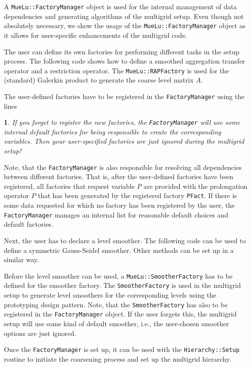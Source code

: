 \documentclass[10pt,fleqn]{book}
\newtheorem*{mycomment}{\ding{42}}
\providecommand\printCppListing[1]{

}
\begin{document}
A \texttt{MueLu::FactoryManager} object is used for the internal management of data dependencies and generating algorithms of the multigrid setup. Even though not absolutely necessary, we show the usage of the \texttt{MueLu::FactoryManager} object as it allows for  user-specific enhancements of the multigrid code.
\printCppListing{ScalingTest.cpp_12.fragment}

The user can define its own factories for performing different tasks in the setup process. The following code shows how to define a smoothed aggregation transfer operator and a restriction operator. The \texttt{MueLu::RAPFactory} is used for the (standard) Galerkin product to generate the coarse level matrix $A$.
\printCppListing{ScalingTest.cpp_14.fragment}

The user-defined factories have to be registered in the \texttt{FactoryManager} using the lines
\printCppListing{ScalingTest.cpp_16.fragment}
\begin{mycomment}
If you forget to register the new factories, the \texttt{FactoryManager} will use some internal default factories for being responsible to create the corresponding variables. Then your user-specified factories are just ignored during the multigrid setup!
\end{mycomment}
Note, that the \texttt{FactoryManager} is also responsible for resolving all dependencies between different factories. That is, after the user-defined factories have been registered, all factories that request variable $P$ are provided with the prolongation operator $P$ that has been generated by the registered factory \texttt{PFact}. If there is some data requested for which no factory has been registered by the user, the \texttt{FactoryManager} manages an internal list for reasonable default choices and default factories.

Next, the user has to declare a level smoother. The following code can be used to define a symmetric Gauss-Seidel smoother. Other methods can be set up in a similar way.
\printCppListing{ScalingTest.cpp_18.fragment}
Before the level smoother can be used, a \texttt{MueLu::SmootherFactory} has to be defined for the smoother factory. The \texttt{SmootherFactory} is used in the multigrid setup to generate level smoothers for the corresponding levels using the prototyping design pattern. Note, that the \texttt{SmootherFactory} has also to be registered in the \texttt{FactoryManager} object. If the user forgets this, the multigrid setup will use some kind of default smoother, i.e., the user-chosen smoother options are just ignored.
\printCppListing{ScalingTest.cpp_20.fragment}
Once the \texttt{FactoryManager} is set up, it can be used with the \texttt{Hierarchy::Setup} routine to initiate the coarsening process and set up the multigrid hierarchy.
\printCppListing{ScalingTest.cpp_22.fragment}
\end{document}
